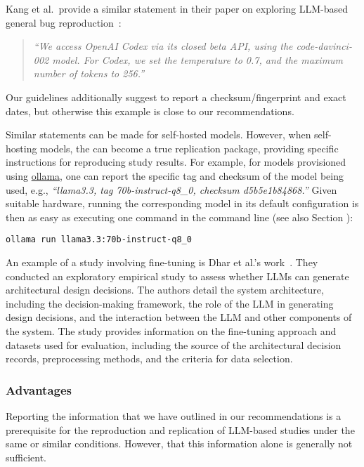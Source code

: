 Kang et al.~provide a similar statement in their paper on exploring LLM-based general bug reproduction~\cite{DBLP:conf/icse/KangYY23}:

\begin{quote}
\it
``We access OpenAI Codex via its closed beta API, using the code-davinci-002 model. For Codex, we set the temperature to 0.7, and the maximum number of tokens to 256.''
\end{quote}

Our guidelines additionally suggest to report a checksum/fingerprint and exact dates, but otherwise this example is close to our recommendations. 

Similar statements can be made for self-hosted models.
However, when self-hosting models, the \supplementarymaterial can become a true replication package, providing specific instructions for reproducing study results.
For example, for models provisioned using \href{https://ollama.com/library/}{ollama}, one can report the specific tag and checksum of the model being used, e.g., \emph{``llama3.3, tag 70b-instruct-q8\_0, checksum d5b5e1b84868.''}
Given suitable hardware, running the corresponding model in its default configuration is then as easy as executing one command in the command line (see also Section \openllm):

\begin{verbatim}
ollama run llama3.3:70b-instruct-q8_0
\end{verbatim}

An example of a study involving fine-tuning is Dhar et al.'s work~\cite{DBLP:conf/icsa/DharVV24}.
They conducted an exploratory empirical study to assess whether LLMs can generate architectural design decisions. The authors detail the system architecture, including the decision-making framework, the role of the LLM in generating design decisions, and the interaction between the LLM and other components of the system. The study provides information on the fine-tuning approach and datasets used for evaluation, including the source of the architectural decision records, preprocessing methods, and the criteria for data selection. 


\subsubsection{Advantages}

Reporting the information that we have outlined in our recommendations is a prerequisite for the reproduction and replication of LLM-based studies under the same or similar conditions.
However, that this information alone is generally not sufficient.

